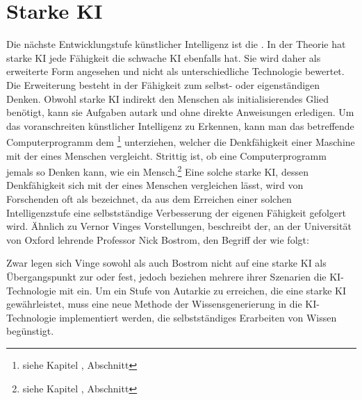 \documentclass[12pt,german,ngerman]{report}
\begin{document}
    \section{Starke KI}
        Die nächste Entwicklungstufe künstlicher Intelligenz ist
        die .
        In der Theorie hat starke KI jede Fähigkeit die schwache KI ebenfalls hat.
        Sie wird daher als erweiterte Form angesehen und nicht als unterschiedliche
        Technologie bewertet.
        Die Erweiterung besteht in der Fähigkeit zum selbst- oder eigenständigen Denken. Obwohl
        starke KI indirekt den Menschen als initialisierendes Glied benötigt,
        kann sie Aufgaben autark und ohne direkte Anweisungen erledigen.
        Um das voranschreiten künstlicher Intelligenz zu Erkennen, kann
        man das betreffende Computerprogramm dem 
        \footnote{siehe Kapitel , Abschnitt } unterziehen,
        welcher die Denkfähigkeit einer Maschine mit der eines Menschen vergleicht.
        Strittig ist, ob eine Computerprogramm jemals so Denken kann, wie ein 
        Mensch.\footnote{siehe Kapitel , Abschnitt }
        Eine solche starke KI, dessen Denkfähigkeit sich mit der eines Menschen vergleichen lässt, wird
        von Forschenden oft als  bezeichnet, da aus dem Erreichen einer solchen Intelligenzstufe
        eine selbstständige Verbesserung der eigenen Fähigkeit gefolgert wird.
        Ähnlich zu Vernor Vinges Vorstellungen, beschreibt der, an der Universität von Oxford lehrende Professor
        Nick Bostrom, den Begriff der  wie folgt:
        \begin{displayquote}
            \cite{bostrom1998long}
        \end{displayquote}
        Zwar legen sich Vinge sowohl als auch Bostrom nicht auf eine starke KI als Übergangspunkt
        zur \cite{vinge1993technological} oder \cite{bostrom1998long} fest,
        jedoch beziehen mehrere ihrer Szenarien die KI-Technologie mit ein.
        Um ein Stufe von Autarkie zu erreichen, die eine starke KI gewährleistet, muss eine neue Methode
        der Wissensgenerierung in die KI-Technologie implementiert werden, die selbstständiges Erarbeiten von Wissen begünstigt.
        
\end{document}
